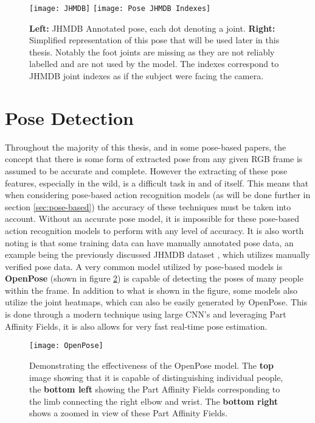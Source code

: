 \begin{figure}[ht]
	\texttt{[image: JHMDB]}
	\texttt{[image: Pose JHMDB Indexes]}
	\centering
	\caption{\textbf{Left:} JHMDB Annotated pose, each dot denoting a joint. \textbf{Right:} Simplified representation of this pose that will be used later in this thesis. Notably the foot joints are missing as they are not reliably labelled and are not used by the model. The indexes correspond to JHMDB joint indexes as if the subject were facing the camera.}
	\label{fig:JHMDB}
\end{figure}

\section{Pose Detection}
\label{sec:pose-detection}

Throughout the majority of this thesis, and in some pose-based papers, the concept that there is some form of extracted pose from any given RGB frame is assumed to be accurate and complete. However the extracting of these pose features, especially in the wild, is a difficult task in and of itself. This means that when considering pose-based action recognition models (as will be done further in section \ref{sec:pose-based}) the accuracy of these techniques must be taken into account. Without an accurate pose model, it is impossible for these pose-based action recognition models to perform with any level of accuracy. It is also worth noting is that some training data can have manually annotated pose data, an example being the previously discussed JHMDB dataset \cite{JHMDB}, which utilizes manually verified pose data. A very common model utilized by pose-based models is \textbf{OpenPose} \cite{openpose} (shown in figure \ref{fig:openpose}) is capable of detecting the poses of many people within the frame. In addition to what is shown in the figure, some models also utilize the joint heatmaps, which can also be easily generated by OpenPose. This is done through a modern technique using large CNN's and leveraging Part Affinity Fields, it is also allows for very fast real-time pose estimation.

\begin{figure}[ht]
	\texttt{[image: OpenPose]}
	\centering
	\caption{Demonstrating the effectiveness of the OpenPose \cite{openpose} model. The \textbf{top} image showing that it is capable of distinguishing individual people, the \textbf{bottom left} showing the Part Affinity Fields corresponding to the limb connecting the right elbow and wrist. The \textbf{bottom right} shows a zoomed in view of these Part Affinity Fields.}
	\label{fig:openpose}
\end{figure}

